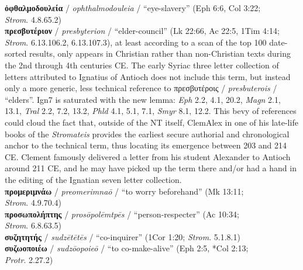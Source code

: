 \noindent{}\textbf{ὀφθαλμοδουλεία} / \textit{ophthalmodouleia} / “eye-slavery” (Eph 6:6, Col 3:22; \\\makebox[3em][l]{}\textit{Strom}. 4.8.65.2) \\[0.4mm] %
 \noindent{}\textbf{πρεσβυτέριον} / \textit{presbyterion} / “elder-council” (Lk 22:66, Ac 22:5, 1Tim 4:14; %
 \textit{Strom}. 6.13.106.2, 6.13.107.3), %
 at least according to a scan of the top 100 date-sorted results, %
 only appears in Christian rather than non-Christian texts during the 2nd through 4th centuries CE. %
 The early Syriac three letter collection of letters attributed to Ignatius of Antioch %
 does not include this term, but instead only a more generic, %
 less technical reference to πρεσβυτέροις / \textit{presbuterois} / “elders”. %
Ign7 is saturated with the new lemma: %
\textit{Eph} 2.2, 4.1, 20.2, \textit{Magn} 2.1, 13.1, \textit{Tral} 2.2, 7.2, 13.2, \textit{Phld} 4.1, 5.1, 7.1, \textit{Smyr} 8.1, 12.2. %
This bevy of references could cloud the fact that, outside of the NT itself, %
ClemAlex in one of his late-life books of the \textit{Stromateis} %
provides the earliest secure authorial and chronological anchor to the technical term, %
thus locating its emergence between 203 and 214 CE. %
Clement famously delivered a letter from his student Alexander to Antioch around 211 CE, %
and he may have picked up the term there and/or had a hand %
in the editing of the Ignatian seven letter collection. \\[1mm] %
\noindent{}\textbf{προμεριμνάω} / \textit{preomerimnaō} / “to worry beforehand” (Mk 13:11; %
\\\makebox[3em][l]{}\textit{Strom}. 4.9.70.4) \\[0.4mm] %
\noindent{}\textbf{προσωπολήπτης} / \textit{prosōpolēmtpēs} / “person-respecter” (Ac 10:34; %
\\\makebox[3em][l]{}\textit{Strom}. 6.8.63.5) \\[0.4mm] %
\noindent{}\textbf{συζητητής} / \textit{sudzētētēs} / “co-inquirer” (1Cor 1:20; \textit{Strom}. 5.1.8.1) \\[0.4mm] %
\noindent{}\textbf{συζωοποιέω} / \textit{sudzōopoieō} / “to co-make-alive” (Eph 2:5, *Col 2:13; %
\\\makebox[3em][l]{}\textit{Protr}. 2.27.2) \\[0.4mm] %
